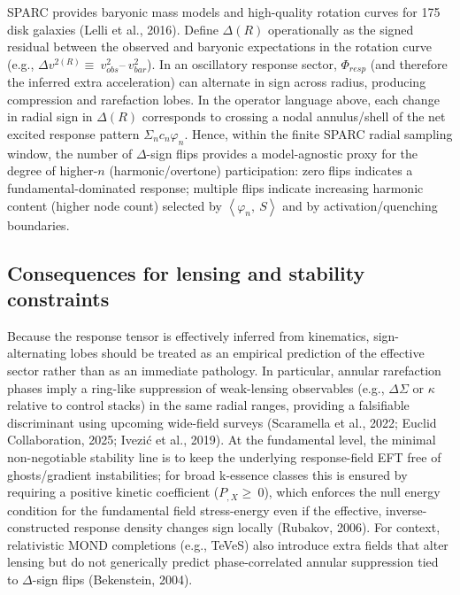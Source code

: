 \documentclass[11pt]{article}
\begin{document}
SPARC provides baryonic mass models and high-quality rotation curves for 175 disk galaxies (Lelli et al., 2016). Define \(\Delta(R)\) operationally \citep{McGaugh2014, Ivezic2019} as the signed residual between the observed and baryonic expectations in the rotation curve (e.g., \(\Delta v^{2(R)} \equiv \ v_{obs}^{2}–\ v_{bar}^{2}\)). In an oscillatory response sector, \(\Phi_{resp}\) (and therefore the inferred extra acceleration) can alternate in sign across radius, producing compression and rarefaction lobes. In the operator language above, each change in radial sign in \(\Delta(R)\) corresponds to crossing a nodal annulus/shell of the net excited response pattern \(\Sigma_{n}c_{n}\varphi_{n}\). Hence, within the finite SPARC radial sampling window, the number of \(\Delta\)-sign flips provides a model-agnostic proxy for the degree of higher-\(n\) (harmonic/overtone) participation: zero flips indicates a fundamental-dominated response; multiple flips indicate increasing harmonic content (higher node count) selected by \(\left\langle \varphi_{n},\ S \right\rangle\) and by activation/quenching boundaries.

\subsection{Consequences for lensing and stability constraints}\label{d.5-consequences-for-lensing-and-stability-constraints}

Because the response tensor is effectively inferred from kinematics, sign-alternating lobes should be treated as an empirical prediction of the effective sector rather than as an immediate pathology. In particular, annular rarefaction phases imply a ring-like suppression of weak-lensing observables (e.g., \(\Delta\Sigma\) or \(\kappa\) relative to control stacks) in the same radial ranges, providing a falsifiable discriminant using upcoming wide-field surveys (Scaramella et al., 2022; Euclid Collaboration, 2025; Ivezić et al., 2019). At the fundamental level, \citep{Buniy2006, Rubakov2006, Rubakov2014} the minimal non-negotiable stability line is to keep the underlying response-field EFT free of ghosts/gradient instabilities; for broad k-essence classes this is ensured by requiring a positive kinetic coefficient (\(P_{,X} \geq \ 0\)), which enforces the null energy condition for the fundamental field stress-energy even if the effective, inverse-constructed response density changes sign locally (Rubakov, 2006). For context, relativistic MOND completions (e.g., TeVeS) also introduce extra fields that alter lensing but do not generically predict phase-correlated annular suppression tied to \(\Delta\)-sign flips (Bekenstein, 2004).
\end{document}
